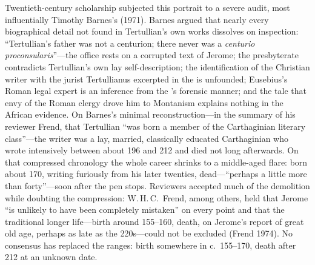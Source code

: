 Twentieth-century scholarship subjected this portrait to a severe audit, most
influentially Timothy Barnes's  (1971). Barnes argued that nearly every biographical detail not found in
Tertullian's own works dissolves on inspection: ``Tertullian's father was not a
centurion; there never was a \textit{centurio proconsularis}''---the office
rests on a corrupted text of Jerome; the presbyterate contradicts Tertullian's
own lay self-description; the identification of the Christian writer with the
jurist Tertullianus excerpted in the  is unfounded; Eusebius's
Roman legal expert is an inference from the 's forensic manner;
and the tale that envy of the Roman clergy drove him to Montanism explains
nothing in the African evidence. On Barnes's minimal reconstruction---in the
summary of his reviewer Frend, that Tertullian ``was born a member of the
Carthaginian literary class''---the writer was a lay, married, classically
educated Carthaginian who wrote intensively
between about 196 and 212 and died not long afterwards. On that compressed chronology the whole career shrinks to a
middle-aged flare: born about 170, writing furiously from his later twenties,
dead---``perhaps a little more than forty''---soon after the pen stops.
Reviewers accepted much
of the demolition while doubting the compression: W.\,H.\,C.\ Frend, among
others, held that Jerome ``is unlikely to have been completely mistaken'' on
every point and that the traditional longer life---birth around 155--160,
death, on Jerome's report of great old age, perhaps as late as the 220s---could
not be excluded (Frend 1974). No consensus has replaced the ranges: birth
somewhere in c.~155--170, death after 212 at an unknown date.

